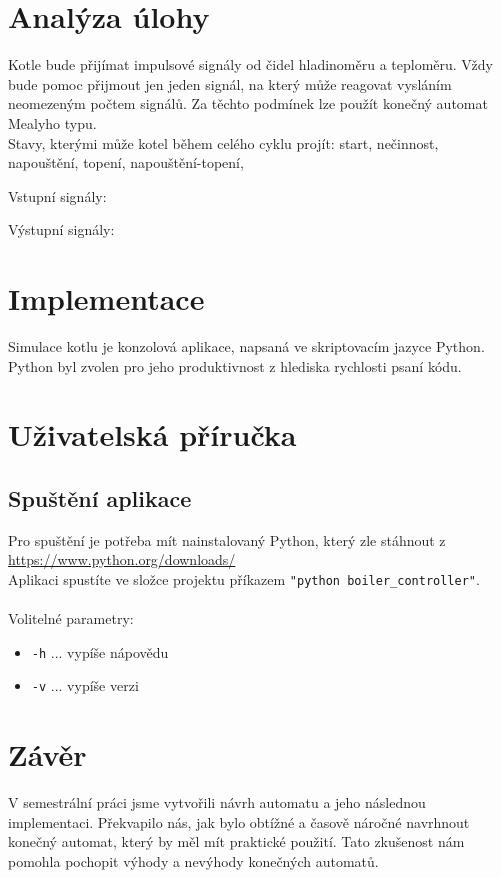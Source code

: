 \documentclass[12pt]{report}
\begin{document}
\chapter{Analýza úlohy}
Kotle bude přijímat impulsové signály od čidel hladinoměru a teploměru. Vždy bude pomoc přijmout jen jeden signál, na který může reagovat vysláním neomezeným počtem signálů.
Za těchto podmínek lze použít konečný automat Mealyho typu.\\
Stavy, kterými může kotel během celého cyklu projít: start, nečinnost, napouštění, topení, napouštění-topení,

Vstupní signály: 

Výstupní signály: 

\chapter{Implementace}
Simulace kotlu je konzolová aplikace, napsaná ve skriptovacím jazyce Python. Python byl zvolen pro jeho produktivnost z hlediska rychlosti psaní kódu.



\chapter{Uživatelská příručka}
\section{Spuštění aplikace}
Pro spuštění je potřeba mít nainstalovaný Python, který zle stáhnout z \url{https://www.python.org/downloads/}\\
Aplikaci spustíte ve složce projektu příkazem \texttt{"python boiler\_controller"}.\\
\\
Volitelné parametry:
\begin{itemize}
	\item \texttt{-h} ... vypíše nápovědu
	\item \texttt{-v} ... vypíše verzi
\end{itemize}


\chapter{Závěr}
V semestrální práci jsme vytvořili návrh automatu a jeho následnou implementaci.
Překvapilo nás, jak bylo obtížné a časově náročné navrhnout konečný automat, který by měl mít praktické použití. Tato zkušenost nám pomohla pochopit výhody a nevýhody konečných automatů.
\end{document}
